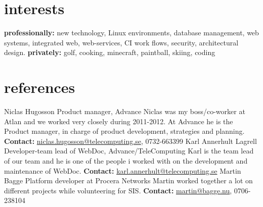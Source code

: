 \documentclass[]{friggeri-cv} %
\begin{document}

\section{interests}

\textbf{professionally:} new technology, Linux environments, database management, web systems, integrated web, web-services, CI work flows, security, architectural design. \textbf{privately:} golf, cooking, minecraft, paintball, skiing, coding


\section{references}
\begin{entrylist}
	\entry
	{}
	{Niclas Hugosson}
	{Product manager, Advance}
	{Niclas was my boss/co-worker at Atlan and we worked very closely during 2011-2012. At Advance he is the Product manager, in charge of product development, strategies and planning. \textbf{Contact:} \href{mailto:niclas.hugosson@telecomputing.se}{niclas.hugosson@telecomputing.se}, 0732-663399}
	\entry
	{}
	{Karl Annerhult Lagrell}
	{Developer-team lead of WebDoc, Advance/TeleComputing}
	{Karl is the team lead of our team and he is one of the people i worked with on the development and maintenance of WebDoc. \textbf{Contact:} \href{mailto:karl.annerhult@telecomputing.se}{karl.annerhult@telecomputing.se}}
	\entry
	{}
	{Martin Bagge}
	{Platform developer at Procera Networks}
	{Martin worked together a lot on different projects while volunteering for SIS. \textbf{Contact:} \href{mailto:martin@bagge.nu}{martin@bagge.nu}, 0706-238104 }
\end{entrylist}


\end{document}
